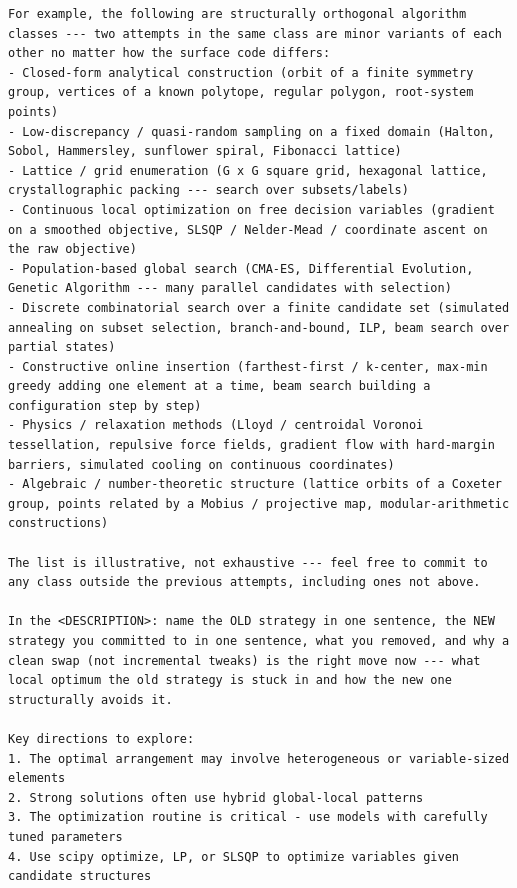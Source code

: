 \begin{ttcolorbox}
\begin{lstlisting}[style=prompt]
For example, the following are structurally orthogonal algorithm classes --- two attempts in the same class are minor variants of each other no matter how the surface code differs:
- Closed-form analytical construction (orbit of a finite symmetry group, vertices of a known polytope, regular polygon, root-system points)
- Low-discrepancy / quasi-random sampling on a fixed domain (Halton, Sobol, Hammersley, sunflower spiral, Fibonacci lattice)
- Lattice / grid enumeration (G x G square grid, hexagonal lattice, crystallographic packing --- search over subsets/labels)
- Continuous local optimization on free decision variables (gradient on a smoothed objective, SLSQP / Nelder-Mead / coordinate ascent on the raw objective)
- Population-based global search (CMA-ES, Differential Evolution, Genetic Algorithm --- many parallel candidates with selection)
- Discrete combinatorial search over a finite candidate set (simulated annealing on subset selection, branch-and-bound, ILP, beam search over partial states)
- Constructive online insertion (farthest-first / k-center, max-min greedy adding one element at a time, beam search building a configuration step by step)
- Physics / relaxation methods (Lloyd / centroidal Voronoi tessellation, repulsive force fields, gradient flow with hard-margin barriers, simulated cooling on continuous coordinates)
- Algebraic / number-theoretic structure (lattice orbits of a Coxeter group, points related by a Mobius / projective map, modular-arithmetic constructions)

The list is illustrative, not exhaustive --- feel free to commit to any class outside the previous attempts, including ones not above.

In the <DESCRIPTION>: name the OLD strategy in one sentence, the NEW strategy you committed to in one sentence, what you removed, and why a clean swap (not incremental tweaks) is the right move now --- what local optimum the old strategy is stuck in and how the new one structurally avoids it.

Key directions to explore:
1. The optimal arrangement may involve heterogeneous or variable-sized elements
2. Strong solutions often use hybrid global-local patterns
3. The optimization routine is critical - use models with carefully tuned parameters
4. Use scipy optimize, LP, or SLSQP to optimize variables given candidate structures
\end{lstlisting}
\end{ttcolorbox}


